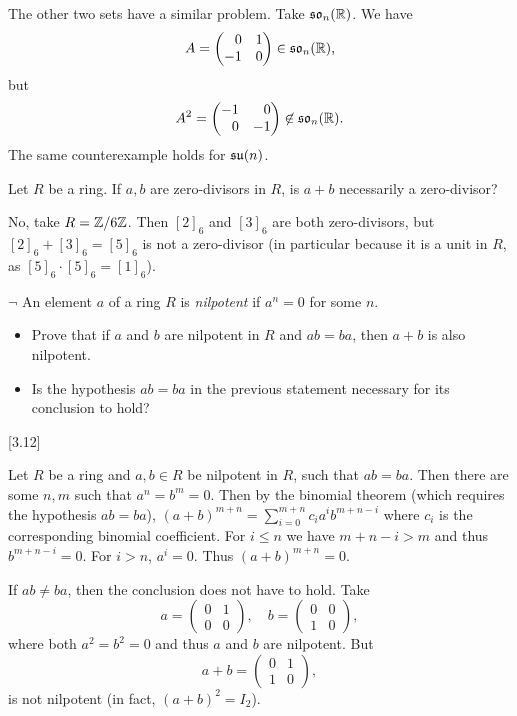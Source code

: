 \begin{solution}
	The other two sets have a similar problem. Take $\mathfrak{so}_n(\mathbb{R})$.  We have
	\[
		A = 
		\begin{pmatrix*}[r]
			0 & 1 \\
			-1 & 0
		\end{pmatrix*} \in \mso_n(\R) \text{,}
	\]
	but
	\[
		A^2 =
		\begin{pmatrix*}[r]
			-1 & 0 \\
			0 & -1
		\end{pmatrix*} \not \in \mso_n(\R) \text{.}
	\]
	The same counterexample holds for $\mathfrak{su}(n)$.
\end{solution}

\begin{problem}
	Let $R$ be a ring. If $a, b$ are zero-divisors in $R$, is $a + b$ necessarily a zero-divisor?
\end{problem}

\begin{solution}
	No, take $R = \mathbb{Z}/6\mathbb{Z}$. Then $[2]_6$ and $[3]_6$ are both zero-divisors, but $[2]_6 + [3]_6 = [5]_6$ is not a zero-divisor (in particular because it is a unit in $R$, as $[5]_6 \cdot [5]_6 = [1]_6$).
\end{solution}

\begin{problem}
	$\neg$ An element $a$ of a ring $R$ is \emph{nilpotent} if $a^n = 0$ for some $n$.
	\begin{itemize}
		\item Prove that if $a$ and $b$ are nilpotent in $R$ and $ab = ba$, then $a + b$ is also nilpotent.
		\item Is the hypothesis $ab = ba$ in the previous statement necessary for its conclusion to hold?
	\end{itemize}
	[3.12]
\end{problem}

\begin{solution}
	Let $R$ be a ring and $a, b \in R$ be nilpotent in $R$, such that $ab = ba$. Then there are some $n, m$ such that $a^n = b^m = 0$. Then by the binomial theorem (which requires the hypothesis $ab = ba$), $(a + b)^{m + n} = \sum_{i=0}^{m+n} c_i a^i b^{m+n-i}$ where $c_i$ is the corresponding binomial coefficient. For $i \leq n$ we have $m + n - i > m$ and thus $b^{m+n-i} = 0$. For $i > n$, $a^i = 0$. Thus $(a+b)^{m+n} = 0$.
	
	If $ab \neq ba$, then the conclusion does not have to hold. Take
	\[
		a =
		\begin{pmatrix}
			0 & 1 \\
			0 & 0
		\end{pmatrix}, \quad
		b =
		\begin{pmatrix}
			0 & 0 \\
			1 & 0
		\end{pmatrix},
	\]
	where both $a^2 = b^2 = 0$ and thus $a$ and $b$ are nilpotent. But
	\[
		a + b =
		\begin{pmatrix}
			0 & 1 \\
			1 & 0
		\end{pmatrix},
	\]
	is not nilpotent (in fact, $(a + b)^2 = I_2$).
\end{solution}

